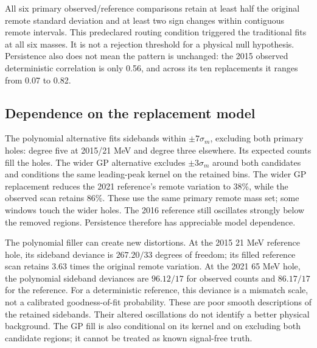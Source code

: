 All six primary observed/reference comparisons retain at least half the original remote standard deviation and at least two sign changes within contiguous remote intervals. This predeclared routing condition triggered the traditional fits at all six masses. It is not a rejection threshold for a physical null hypothesis. Persistence also does not mean the pattern is unchanged: the 2015 observed deterministic correlation is only 0.56, and across its ten replacements it ranges from 0.07 to 0.82.

\clearpage
\subsection{Dependence on the replacement model}
The polynomial alternative fits sidebands within $\pm7\sigma_m$, excluding both primary holes: degree five at 2015/21 MeV and degree three elsewhere. Its expected counts fill the holes. The wider GP alternative excludes $\pm3\sigma_m$ around both candidates and conditions the same leading-peak kernel on the retained bins.
The wider GP replacement reduces the 2021 reference's remote variation to 38\%, while the observed scan retains 86\%. These use the same primary remote mass set; some windows touch the wider holes. The 2016 reference still oscillates strongly below the removed regions. Persistence therefore has appreciable model dependence.

The polynomial filler can create new distortions. At the 2015 21 MeV reference hole, its sideband deviance is $267.20/33$ degrees of freedom; its filled reference scan retains 3.63 times the original remote variation. At the 2021 65 MeV hole, the polynomial sideband deviances are $96.12/17$ for observed counts and $86.17/17$ for the reference. For a deterministic reference, this deviance is a mismatch scale, not a calibrated goodness-of-fit probability. These are poor smooth descriptions of the retained sidebands. Their altered oscillations do not identify a better physical background. The GP fill is also conditional on its kernel and on excluding both candidate regions; it cannot be treated as known signal-free truth.

